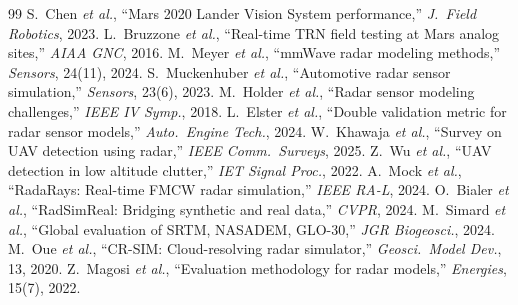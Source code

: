 \documentclass[12pt]{article}
\begin{document}

\begin{thebibliography}{99}
 S.~Chen \textit{et al.}, ``Mars 2020 Lander Vision System performance,'' \textit{J.\ Field Robotics}, 2023.
 L.~Bruzzone \textit{et al.}, ``Real-time TRN field testing at Mars analog sites,'' \textit{AIAA GNC}, 2016.
 M.~Meyer \textit{et al.}, ``mmWave radar modeling methods,'' \textit{Sensors}, 24(11), 2024.
 S.~Muckenhuber \textit{et al.}, ``Automotive radar sensor simulation,'' \textit{Sensors}, 23(6), 2023.
 M.~Holder \textit{et al.}, ``Radar sensor modeling challenges,'' \textit{IEEE IV Symp.}, 2018.
 L.~Elster \textit{et al.}, ``Double validation metric for radar sensor models,'' \textit{Auto.\ Engine Tech.}, 2024.
 W.~Khawaja \textit{et al.}, ``Survey on UAV detection using radar,'' \textit{IEEE Comm.\ Surveys}, 2025.
 Z.~Wu \textit{et al.}, ``UAV detection in low altitude clutter,'' \textit{IET Signal Proc.}, 2022.
 A.~Mock \textit{et al.}, ``RadaRays: Real-time FMCW radar simulation,'' \textit{IEEE RA-L}, 2024.
 O.~Bialer \textit{et al.}, ``RadSimReal: Bridging synthetic and real data,'' \textit{CVPR}, 2024.
 M.~Simard \textit{et al.}, ``Global evaluation of SRTM, NASADEM, GLO-30,'' \textit{JGR Biogeosci.}, 2024.
 M.~Oue \textit{et al.}, ``CR-SIM: Cloud-resolving radar simulator,'' \textit{Geosci.\ Model Dev.}, 13, 2020.
 Z.~Magosi \textit{et al.}, ``Evaluation methodology for radar models,'' \textit{Energies}, 15(7), 2022.
\end{thebibliography}
\end{document}
